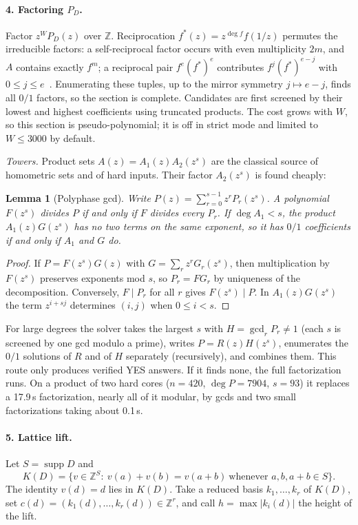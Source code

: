 \documentclass[11pt]{article}
\newtheorem{lemma}{Lemma}
\theoremstyle{definition}
\newcommand{\Z}{\mathbb{Z}}
\DeclareMathOperator{\supp}{supp}
\begin{document}
\paragraph{4. Factoring $P_D$.} Factor $z^WP_D(z)$ over $\Z$. Reciprocation $f^*(z)=z^{\deg f}f(1/z)$ permutes the
irreducible factors: a self-reciprocal factor occurs with even multiplicity $2m$, and $A$ contains exactly $f^m$; a
reciprocal pair $f^e(f^*)^e$ contributes $f^j(f^*)^{e-j}$ with $0\le j\le e$~\cite{RS82}. Enumerating these tuples,
up to the mirror symmetry $j\mapsto e-j$, finds all $0/1$ factors, so the section is complete. Candidates are first
screened by their lowest and highest coefficients using truncated products. The cost grows with $W$, so this section
is pseudo-polynomial; it is off in strict mode and limited to $W\le 3000$ by default.

\emph{Towers.} Product sets $A(z)=A_1(z)A_2(z^s)$ are the classical source of homometric sets and of hard
inputs. Their factor $A_2(z^s)$ is found cheaply:

\begin{lemma}[Polyphase gcd]\label{lem:tower}
Write $P(z)=\sum_{r=0}^{s-1}z^rP_r(z^s)$. A polynomial $F(z^s)$ divides $P$ if and only if $F$ divides every
$P_r$. If $\deg A_1<s$, the product $A_1(z)G(z^s)$ has no two terms on the same exponent, so it has $0/1$
coefficients if and only if $A_1$ and $G$ do.
\end{lemma}
\begin{proof}
If $P=F(z^s)G(z)$ with $G=\sum_r z^rG_r(z^s)$, then multiplication by $F(z^s)$ preserves exponents mod $s$, so
$P_r=FG_r$ by uniqueness of the decomposition. Conversely, $F\mid P_r$ for all $r$ gives $F(z^s)\mid P$. In
$A_1(z)G(z^s)$ the term $z^{i+sj}$ determines $(i,j)$ when $0\le i<s$.
\end{proof}

For large degrees the solver takes the largest $s$ with $H=\gcd_rP_r\ne 1$ (each $s$ is screened by one gcd modulo a
prime), writes $P=R(z)H(z^s)$, enumerates the $0/1$ solutions of $R$ and of $H$ separately (recursively), and combines
them. This route only produces verified YES answers. If it finds none, the full factorization runs. On a product of
two hard cores ($n=420$, $\deg P=7904$, $s=93$) it replaces a 17.9\,s factorization, nearly all of it modular, by
gcds and two small factorizations taking about 0.1\,s.

\paragraph{5. Lattice lift.} Let $S=\supp D$ and
\[
  K(D)=\{v\in\Z^S:\ v(a)+v(b)=v(a+b)\ \text{whenever } a,b,a+b\in S\}.
\]
The identity $v(d)=d$ lies in $K(D)$. Take a reduced basis $k_1,\dots,k_r$ of $K(D)$, set
$c(d)=(k_1(d),\dots,k_r(d))\in\Z^r$, and call $h=\max|k_i(d)|$ the height of the lift.
\end{document}
